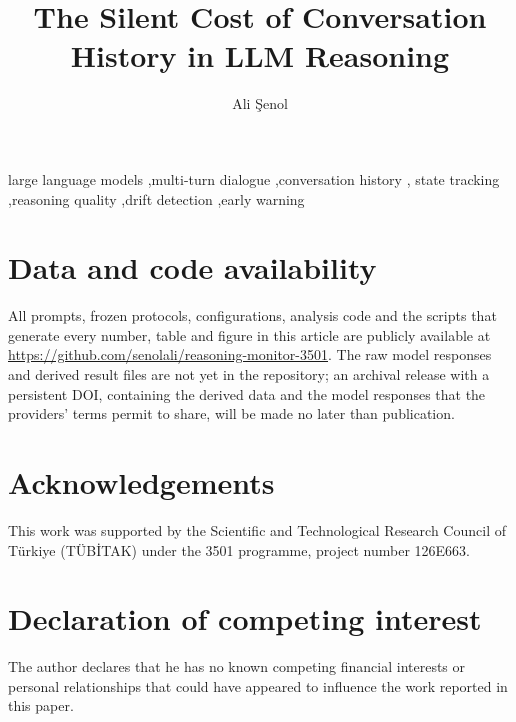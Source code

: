 \documentclass[preprint,11pt,authoryear]{elsarticle}
\begin{document}
\begin{frontmatter}

\title{The Silent Cost of Conversation History in LLM Reasoning}

\author[tarsus]{Ali \c{S}enol}

\begin{abstract}

\end{abstract}

\begin{keyword}
large language models \sep multi-turn dialogue \sep conversation history \sep
state tracking \sep reasoning quality \sep drift detection \sep early warning
\end{keyword}

\end{frontmatter}










\section*{Data and code availability}
All prompts, frozen protocols, configurations, analysis code and the scripts
that generate every number, table and figure in this article are publicly
available at \url{https://github.com/senolali/reasoning-monitor-3501}. The
raw model responses and derived result files are not yet in the repository; an
archival release with a persistent DOI, containing the derived data and the
model responses that the providers' terms permit to share, will be made no
later than publication.

\section*{Acknowledgements}
This work was supported by the Scientific and Technological Research Council of
T\"urkiye (T\"UB\.{I}TAK) under the 3501 programme, project number 126E663.

\section*{Declaration of competing interest}
The author declares that he has no known competing financial interests or
personal relationships that could have appeared to influence the work reported
in this paper.
\end{document}
